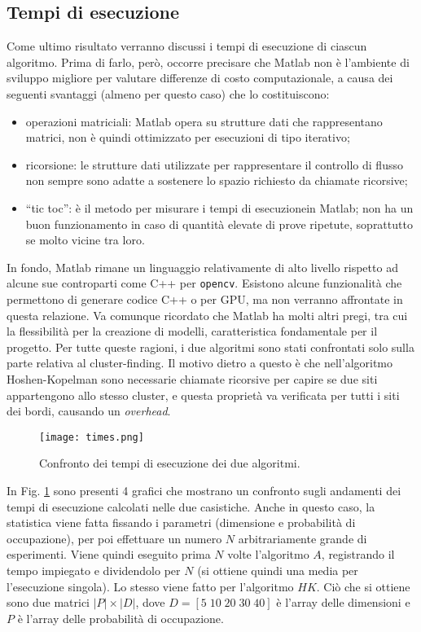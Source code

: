 \subsection*{Tempi di esecuzione}
Come ultimo risultato verranno discussi i tempi di esecuzione di ciascun algoritmo.
Prima di farlo, però, occorre precisare che Matlab non è l'ambiente di sviluppo migliore per valutare 
differenze di costo computazionale, a causa dei seguenti svantaggi (almeno per questo caso) che lo costituiscono:
\begin{itemize}
    \item operazioni matriciali: Matlab opera su strutture dati che rappresentano matrici,
        non è quindi ottimizzato per esecuzioni di tipo iterativo;
    \item ricorsione: le strutture dati utilizzate per 
        rappresentare il controllo di flusso non sempre sono adatte a sostenere lo spazio 
        richiesto da chiamate ricorsive;
    \item ``tic toc'': è il metodo per misurare i tempi di esecuzionein Matlab; non ha un buon funzionamento 
        in caso di quantità elevate di prove ripetute, soprattutto se molto vicine tra loro.
\end{itemize}
In fondo, Matlab rimane un linguaggio relativamente di alto livello rispetto 
ad alcune sue controparti come C++ per \texttt{opencv}.
Esistono alcune funzionalità che permettono di generare codice C++ o per GPU, ma non verranno affrontate in questa relazione.
Va comunque ricordato che Matlab ha molti altri pregi, tra cui la flessibilità
per la creazione di modelli, caratteristica fondamentale per il progetto.
Per tutte queste ragioni, i due algoritmi sono stati confrontati solo sulla parte 
relativa al cluster-finding. Il motivo dietro a questo è che nell'algoritmo Hoshen-Kopelman sono 
necessarie chiamate ricorsive per capire se due siti appartengono allo stesso cluster, e questa 
proprietà va verificata per tutti i siti dei bordi, causando un \textit{overhead}.
\begin{figure}[ht]
    \texttt{[image: times.png]}
    \caption{Confronto dei tempi di esecuzione dei due algoritmi.}
    \label{fig:times}
\end{figure}

In Fig. \ref{fig:times} sono presenti 4 grafici che mostrano un confronto sugli andamenti dei 
tempi di esecuzione calcolati nelle due casistiche.
Anche in questo caso, la statistica viene fatta fissando i parametri (dimensione e probabilità di occupazione),
per poi effettuare un numero $N$ arbitrariamente grande di esperimenti.
Viene quindi eseguito prima $N$ volte l'algoritmo $A$, registrando il tempo impiegato e dividendolo per $N$
(si ottiene quindi una media per l'esecuzione singola).
Lo stesso viene fatto per l'algoritmo $HK$. Ciò che si ottiene sono due matrici $|P| \times |D|$, 
dove $D=[5 \; 10 \; 20 \; 30 \; 40]$ è l'array delle dimensioni e $P$ è l'array delle probabilità di 
occupazione.

